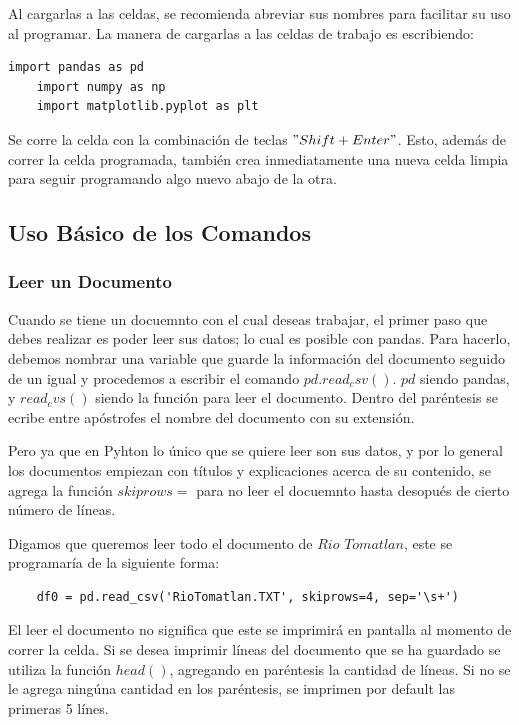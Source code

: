 \documentclass{article}
\begin{document}
    Al cargarlas a las celdas, se recomienda abreviar sus nombres para facilitar su uso al programar. La manera de cargarlas a las celdas de trabajo es escribiendo:
   
    \begin{verbatim}import pandas as pd
	import numpy as np
	import matplotlib.pyplot as plt
    \end{verbatim}
    
    Se corre la celda con la combinación de teclas $"Shift + Enter"$. Esto, además de correr la celda programada, también crea inmediatamente una nueva celda limpia para seguir programando algo nuevo abajo de la otra.
    
\subsection{Uso Básico de los Comandos}
\subsubsection{Leer un Documento}
Cuando se tiene un docuemnto con el cual deseas trabajar, el primer paso que debes realizar es poder leer sus datos; lo cual es posible con pandas. Para hacerlo, debemos nombrar una variable que guarde la información del documento seguido de un igual y procedemos a escribir el comando $pd.read_csv()$. $pd$ siendo pandas, y $read_cvs()$ siendo la función para leer el documento. Dentro del paréntesis se ecribe entre apóstrofes el nombre del documento con su extensión. 

	Pero ya que en Pyhton lo único que se quiere leer son sus datos, y por lo general los documentos empiezan con títulos y explicaciones acerca de su contenido, se agrega la función $skiprows=$ para no leer el docuemnto hasta desopués de cierto número de líneas.
    
    Digamos que queremos leer todo el documento de $Rio$ $Tomatlan$, este se programaría de la siguiente forma:
     \begin{verbatim}
    df0 = pd.read_csv('RioTomatlan.TXT', skiprows=4, sep='\s+')
    \end{verbatim}

    El leer el documento no significa que este se imprimirá en pantalla al momento de correr la celda. Si se desea imprimir líneas del documento que se ha guardado se utiliza la función $head()$, agregando en paréntesis la cantidad de líneas. Si no se le agrega ningúna cantidad en los paréntesis, se imprimen por default las primeras 5 línes. 
    
\end{document}
